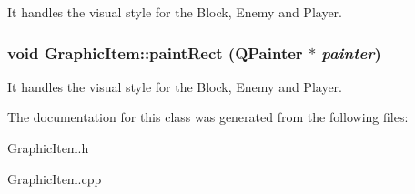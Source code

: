 \label{classGraphicItem_a0cca6d18934673ed5e132951770b0900}
It handles the visual style for the Block, Enemy and Player. \hypertarget{classGraphicItem_af9b320053cd99e8c787bdf782c032624}{
\subsubsection[{paintRect}]{\setlength{\rightskip}{0pt plus 5cm}void GraphicItem::paintRect (QPainter $\ast$ {\em painter})}}
\label{classGraphicItem_af9b320053cd99e8c787bdf782c032624}
It handles the visual style for the Block, Enemy and Player. 

The documentation for this class was generated from the following files:\begin{DoxyCompactItemize}
\item 
GraphicItem.h\item 
GraphicItem.cpp\end{DoxyCompactItemize}
